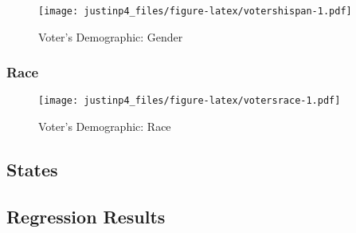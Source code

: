 \documentclass[
]{article}
\begin{document}
\begin{figure}
\centering
\texttt{[image: justinp4\_files/figure-latex/votershispan-1.pdf]}
\caption{\label{fig:votershispan}Voter's Demographic: Gender}
\end{figure}

\hypertarget{race}{%
\subsubsection{Race}\label{race}}

\begin{figure}
\centering
\texttt{[image: justinp4\_files/figure-latex/votersrace-1.pdf]}
\caption{\label{fig:votersrace}Voter's Demographic: Race}
\end{figure}

\hypertarget{states}{%
\subsection{States}\label{states}}

\hypertarget{regression-results}{%
\subsection{Regression Results}\label{regression-results}}
\end{document}
